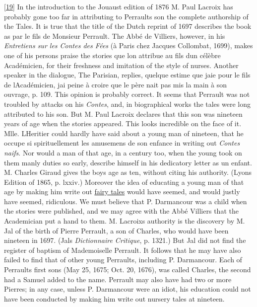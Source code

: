 \documentclass[14pt,a4paper]{memoir}
\newcommand{\ul}[1]{\uline{#1}}
\begin{document}
\protect\hypertarget{4533318093929944247_33931-h-0.htm.xhtmlux5cux23Footnote_19}{}{}\protect\hyperlink{4533318093929944247_33931-h-0.htm.xhtmlux5cux23FNanchor_19}{{{[}19{]}}}
In the introduction to the Jouaust edition of 1876 M. Paul Lacroix has
probably gone too far in attributing to Perrault\textquotesingle s son
the complete authorship of the Tales. It is true that the title of the
Dutch reprint of 1697 describes the book as \textquotesingle par le fils
de Monsieur Perrault.\textquotesingle{} The Abbé de Villiers, however,
in his \emph{Entretiens sur les Contes des Fées} (à Paris chez Jacques
Collombat, 1699), makes one of his persons praise the stories
\textquotesingle que l\textquotesingle on attribue au fils
d\textquotesingle un célèbre Académicien,\textquotesingle{} for their
freshness and imitation of the style of nurses. Another speaker in the
dialogue, The Parisian, replies, \textquotesingle quelque estime que
j\textquotesingle aie pour le fils de l\textquotesingle Académicien,
j\textquotesingle ai peine à croire que le père n\textquotesingle ait
pas mis la main à son ouvrage,\textquotesingle{} p. 109. This opinion is
probably correct. It seems that Perrault was not troubled by attacks on
his \emph{Contes}, and, in biographical works the tales were long
attributed to his son. But M. Paul Lacroix declares that this son was
nineteen years of age when the stories appeared. This looks incredible
on the face of it. Mlle. L\textquotesingle Heritier could hardly have
said about a young man of nineteen, that he \textquotesingle occupe si
spirituellement les amusemens de son enfance\textquotesingle{} in
writing out \emph{Contes naifs}. Nor would a man of that age, in a
century too, when the young took on them manly duties so early, describe
himself in his dedicatory letter as \textquotesingle un
enfant.\textquotesingle{} M. Charles Giraud gives the
boy\textquotesingle s age as ten, without citing his authority. (Lyons
Edition of 1865, p. lxxiv.) Moreover the idea of educating a young man
of that age by making him write out \ul{fairy tales} would have seemed,
and would justly have seemed, ridiculous. We must believe that P.
Darmancour was a child when the stories were published, and we may agree
with the Abbé Villiers that the Academician \textquotesingle put a hand
to them.\textquotesingle{} M. Lacroix\textquotesingle s authority is the
discovery by M. Jal of the birth of Pierre Perrault, a son of Charles,
who would have been nineteen in 1697. (Jal\textquotesingle s
\emph{Dictionnaire Critique}, p. 1321.) But Jal did not find the
register of baptism of Mademoiselle Perrault. It follows that he may
have also failed to find that of other young Perraults, including
\textquotesingle P. Darmancour.\textquotesingle{} Each of
Perrault\textquotesingle s first sons (May 25, 1675; Oct. 20, 1676), was
called Charles, the second had a Samuel added to the name. Perrault may
also have had two or more Pierres; in any case, unless P. Darmancour
were an idiot, his education could not have been conducted by making him
write out nursery tales at nineteen.
\end{document}
